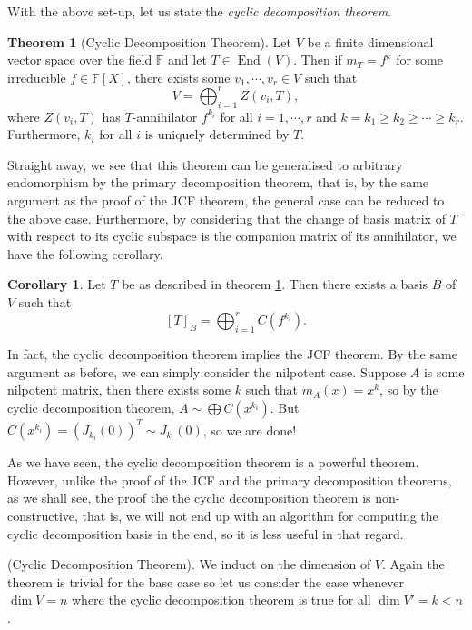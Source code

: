 \documentclass[
]{article}
\theoremstyle{definition}
\newtheorem{theorem}{Theorem}
\newtheorem{corollary}{Corollary}[theorem]
\theoremstyle{definition}
\begin{document}
With the above set-up, let us state the \emph{cyclic decomposition
theorem}.

\begin{theorem}[Cyclic Decomposition Theorem]\label{cyclic_dcomp}
  Let \(V\) be a finite dimensional vector space over the field \(\mathbb{F}\) 
  and let \(T \in \mathop{\mathrm{End}}(V)\). Then if \(m_T = f^k\) for some irreducible 
  \(f \in \mathbb{F}[X]\), there exists some \(v_1, \cdots, v_r \in V\) such 
  that 
  \[V = \bigoplus_{i = 1}^r Z(v_i, T),\]
  where \(Z(v_i, T)\) has \(T\)-annihilator \(f^{k_i}\) for all \(i = 1, \cdots, r\) 
  and \(k = k_1 \ge k_2 \ge \cdots \ge k_r\). Furthermore, \(k_i\) for all \(i\) is 
  uniquely determined by \(T\).
\end{theorem}

Straight away, we see that this theorem can be generalised to arbitrary
endomorphism by the primary decomposition theorem, that is, by the same
argument as the proof of the JCF theorem, the general case can be
reduced to the above case. Furthermore, by considering that the change
of basis matrix of \(T\) with respect to its cyclic subspace is the
companion matrix of its annihilator, we have the following corollary.

\begin{corollary}\label{rat_lemma}
  Let \(T\) be as described in theorem \ref{cyclic_dcomp}. Then there exists a 
  basis \(B\) of \(V\) such that 
  \[[T]_B = \bigoplus_{i = 1}^r C(f^{k_i}).\]
\end{corollary}

In fact, the cyclic decomposition theorem implies the JCF theorem. By
the same argument as before, we can simply consider the nilpotent case.
Suppose \(A\) is some nilpotent matrix, then there exists some \(k\)
such that \(m_A(x) = x^k\), so by the cyclic decomposition theorem,
\(A \sim \bigoplus C(x^{k_i})\). But
\(C(x^{k_i}) = (J_{k_i}(0))^T \sim J_{k_i}(0)\), so we are done!

As we have seen, the cyclic decomposition theorem is a powerful theorem.
However, unlike the proof of the JCF and the primary decomposition
theorems, as we shall see, the proof the the cyclic decomposition
theorem is non-constructive, that is, we will not end up with an
algorithm for computing the cyclic decomposition basis in the end, so it
is less useful in that regard.

\proof (Cyclic Decomposition Theorem). We induct on the dimension of
\(V\). Again the theorem is trivial for the base case so let us consider
the case whenever \(\dim V = n\) where the cyclic decomposition theorem
is true for all \(\dim V' = k < n\).
\end{document}
